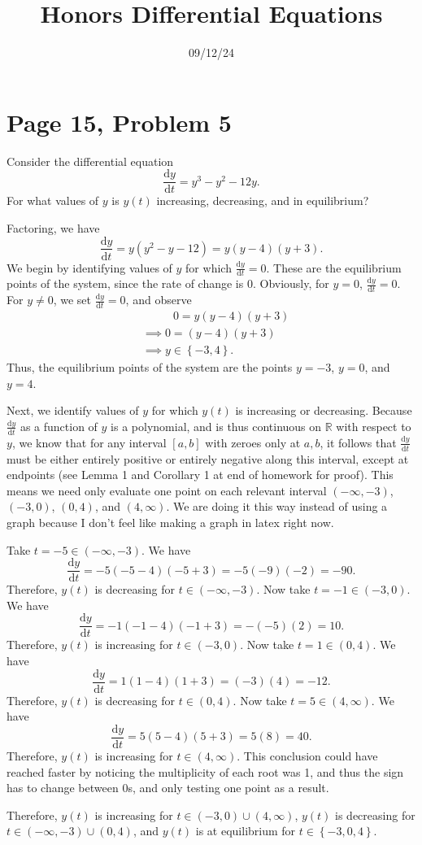 \documentclass[11pt, letterpaper]{report}
\title{Honors Differential Equations}
\date{09/12/24}
\begin{document}
\makeproblem
\section*{Page 15, Problem 5}
Consider the differential equation
\[
	\frac{\mathrm{d}y}{\mathrm{d}t} =y^3-y^2-12y
.\]
For what values of $y$ is $y(t)$ increasing, decreasing, and in equilibrium?
\begin{solution}
	Factoring, we have
	\[
		\frac{\mathrm{d}y}{\mathrm{d}t} =y\left( y^2-y-12 \right) =y\left( y-4 \right) \left( y+3 \right) 
	.\]
	We begin by identifying values of $y$ for which $\frac{\mathrm{d}y}{\mathrm{d}t} =0$. These are the equilibrium points of the system, since the rate of change is 0. Obviously, for $y=0$, $\frac{\mathrm{d}y}{\mathrm{d}t} =0$. For $y\neq 0$, we set $\frac{\mathrm{d}y}{\mathrm{d}t} =0$, and observe
	\begin{align*}
		&\qquad\;\;\, 0=y(y-4)(y+3)\\
		&\implies0=(y-4)(y+3)\\
		&\implies y\in\left\{ -3,4 \right\} 
	.\end{align*}
Thus, the equilibrium points of the system are the points $y=-3$, $y=0$, and $y=4$.

Next, we identify values of $y$ for which $y(t)$ is increasing or decreasing. Because $\frac{\mathrm{d}y}{\mathrm{d}t} $ as a function of $y$ is a polynomial, and is thus continuous on $\mathbb{R}$ with respect to $y$, we know that for any interval $[a,b]$ with zeroes only at $a,b$, it follows that $\frac{\mathrm{d}y}{\mathrm{d}t} $ must be either entirely positive or entirely negative along this interval, except at endpoints (see Lemma 1 and Corollary 1 at end of homework for proof). This means we need only evaluate one point on each relevant interval $(-\infty,-3)$, $(-3,0)$, $(0,4)$, and $(4,\infty)$. We are doing it this way instead of using a graph because I don't feel like making a graph in latex right now.

Take $t=-5\in(-\infty,-3)$. We have
\[
	\frac{\mathrm{d}y}{\mathrm{d}t} =-5\left( -5-4 \right) \left( -5+3 \right) =-5(-9)(-2)=-90
.\]
Therefore, $y(t)$ is decreasing for $t\in(-\infty,-3)$. Now take $t=-1\in(-3,0)$. We have
\[
	\frac{\mathrm{d}y}{\mathrm{d}t} =-1(-1-4)(-1+3)=-(-5)(2)=10
.\]
Therefore, $y(t)$ is increasing for $t\in(-3,0)$. Now take $t=1\in(0,4)$. We have
\[
	\frac{\mathrm{d}y}{\mathrm{d}t} =1(1-4)(1+3)=(-3)(4)=-12
.\]
Therefore, $y(t)$ is decreasing for $t\in(0,4)$. Now take $t=5\in(4,\infty)$. We have
\[
	\frac{\mathrm{d}y}{\mathrm{d}t} =5(5-4)(5+3)=5(8)=40
.\]
Therefore, $y(t)$ is increasing for $t\in(4,\infty)$. This conclusion could have reached faster by noticing the multiplicity of each root was 1, and thus the sign has to change between $0$s, and only testing one point as a result.

Therefore, $y(t)$ is increasing for $t\in\left( -3,0 \right) \cup \left( 4,\infty \right) $, $y(t)$ is decreasing for $t\in\left( -\infty,-3 \right) \cup \left( 0,4 \right) $, and $y(t)$ is at equilibrium for $t\in\left\{ -3,0,4 \right\} $.
\end{solution}
\end{document}
